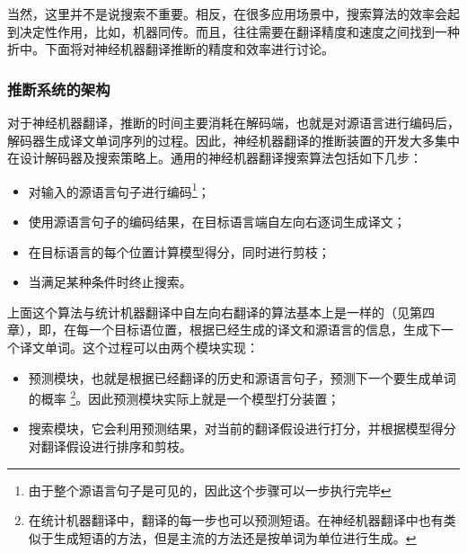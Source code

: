 \parinterval 当然，这里并不是说搜索不重要。相反，在很多应用场景中，搜索算法的效率会起到决定性作用，比如，机器同传\cite{DBLP:journals/corr/abs-1810-08398}。而且，往往需要在翻译精度和速度之间找到一种折中。下面将对神经机器翻译推断的精度和效率进行讨论。


\subsubsection{推断系统的架构}

\parinterval 对于神经机器翻译，推断的时间主要消耗在解码端，也就是对源语言进行编码后，解码器生成译文单词序列的过程。因此，神经机器翻译的推断装置的开发大多集中在设计解码器及搜索策略上。通用的神经机器翻译搜索算法包括如下几步：

\begin{itemize}
\vspace{0.5em}
\item 对输入的源语言句子进行编码\footnote{由于整个源语言句子是可见的，因此这个步骤可以一步执行完毕}；
\vspace{0.5em}
\item 使用源语言句子的编码结果，在目标语言端自左向右逐词生成译文；
\vspace{0.5em}
\item 在目标语言的每个位置计算模型得分，同时进行剪枝；
\vspace{0.5em}
\item 当满足某种条件时终止搜索。
\vspace{0.5em}
\end{itemize}

\parinterval 上面这个算法与统计机器翻译中自左向右翻译的算法基本上是一样的（见第四章），即，在每一个目标语位置，根据已经生成的译文和源语言的信息，生成下一个译文单词。这个过程可以由两个模块实现\cite{DBLP:conf/emnlp/StahlbergHSB17}：

\begin{itemize}
\vspace{0.5em}
\item 预测模块，也就是根据已经翻译的历史和源语言句子，预测下一个要生成单词的概率 \footnote{在统计机器翻译中，翻译的每一步也可以预测短语。在神经机器翻译中也有类似于生成短语的方法，但是主流的方法还是按单词为单位进行生成。}。因此预测模块实际上就是一个模型打分装置；
\vspace{0.5em}
\item 搜索模块，它会利用预测结果，对当前的翻译假设进行打分，并根据模型得分对翻译假设进行排序和剪枝。
\vspace{0.5em}
\end{itemize}

